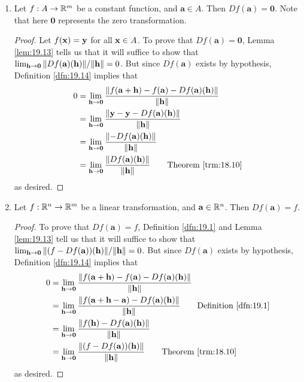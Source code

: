\documentclass[../main.tex]{subfiles}
\begin{document}
\begin{exercise}\label{exr:19.17}\leavevmode
    \begin{enumerate}[label={(\alph*)}]
        \item Let $f:A\to\mathbb{R}^m$ be a constant function, and $\mathbf{a}\in A$. Then $Df(\mathbf{a})=\mathbf{0}$. Note that here $\mathbf{0}$ represents the zero transformation.
        \begin{proof}
            Let $f(\mathbf{x})=\mathbf{y}$ for all $\mathbf{x}\in A$. To prove that $Df(\mathbf{a})=\mathbf{0}$, Lemma \ref{lem:19.13} tells us that it will suffice to show that $\lim_{\mathbf{h}\to\mathbf{0}}\norm{Df(\mathbf{a})(\mathbf{h})}/\norm{\mathbf{h}}=0$. But since $Df(\mathbf{a})$ exists by hypothesis, Definition \ref{dfn:19.14} implies that
            \begin{align*}
                0 &= \lim_{\h\to\mathbf{0}}\frac{\norm{f(\mathbf{a}+\h)-f(\mathbf{a})-Df(\mathbf{a})(\h)}}{\norm{\h}}\\
                &= \lim_{\h\to\mathbf{0}}\frac{\norm{\y-\y-Df(\mathbf{a})(\h)}}{\norm{\h}}\\
                &= \lim_{\h\to\mathbf{0}}\frac{\norm{-Df(\mathbf{a})(\h)}}{\norm{\h}}\\
                &= \lim_{\h\to\mathbf{0}}\frac{\norm{Df(\mathbf{a})(\h)}}{\norm{\h}}\tag*{Theorem \ref{trm:18.10}}
            \end{align*}
            as desired.
        \end{proof}
        \item Let $f:\mathbb{R}^n\to\mathbb{R}^m$ be a linear transformation, and $\mathbf{a}\in\mathbb{R}^n$. Then $Df(\mathbf{a})=f$.
        \begin{proof}
            To prove that $Df(\mathbf{a})=f$, Definition \ref{dfn:19.1} and Lemma \ref{lem:19.13} tell us that it will suffice to show that $\lim_{\mathbf{h}\to\mathbf{0}}\norm{(f-Df(\mathbf{a}))(\mathbf{h})}/\norm{\mathbf{h}}=0$. But since $Df(\mathbf{a})$ exists by hypothesis, Definition \ref{dfn:19.14} implies that
            \begin{align*}
                0 &= \lim_{\h\to\mathbf{0}}\frac{\norm{f(\mathbf{a}+\h)-f(\mathbf{a})-Df(\mathbf{a})(\h)}}{\norm{\h}}\\
                &= \lim_{\h\to\mathbf{0}}\frac{\norm{f(\mathbf{a}+\h-\mathbf{a})-Df(\mathbf{a})(\h)}}{\norm{\h}}\tag*{Definition \ref{dfn:19.1}}\\
                &= \lim_{\h\to\mathbf{0}}\frac{\norm{f(\h)-Df(\mathbf{a})(\h)}}{\norm{\h}}\\
                &= \lim_{\h\to\mathbf{0}}\frac{\norm{(f-Df(\mathbf{a}))(\h)}}{\norm{\h}}\tag*{Theorem \ref{trm:18.10}}
            \end{align*}
            as desired.
        \end{proof}
    \end{enumerate}
\end{exercise}
\end{document}
